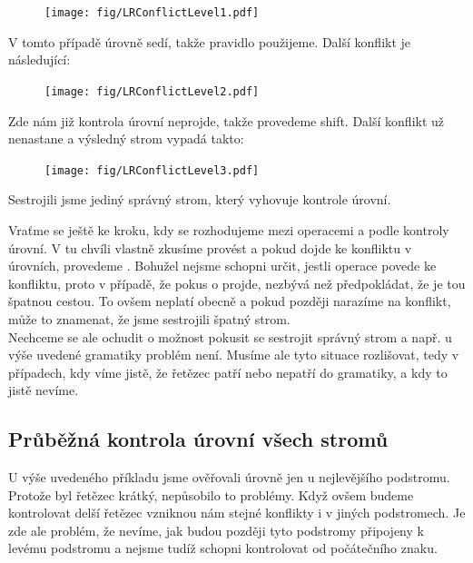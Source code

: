 \begin{exmp}
  \begin{figure}[H]
    \centering
    \texttt{[image: fig/LRConflictLevel1.pdf]}
  \end{figure}

  V tomto případě úrovně sedí, takže pravidlo použijeme.
  Další konflikt je následující:

  \begin{figure}[H]
    \centering
    \texttt{[image: fig/LRConflictLevel2.pdf]}
  \end{figure}

  Zde nám již kontrola úrovní neprojde, takže provedeme shift.
  Další konflikt už nenastane a výsledný strom vypadá takto:

  \begin{figure}[H]
    \centering
    \texttt{[image: fig/LRConflictLevel3.pdf]}
  \end{figure}

  Sestrojili jsme jediný správný strom, který vyhovuje kontrole úrovní.
\end{exmp}

Vraťme se ještě ke kroku, kdy se rozhodujeme mezi operacemi  a
 podle kontroly úrovní. V tu chvíli vlastně zkusíme provést
 a pokud dojde ke konfliktu v úrovních, provedeme .
Bohužel nejsme schopni určit, jestli operace  povede ke konfliktu,
proto v případě, že pokus o  projde, nezbývá než předpokládat, že
 je tou špatnou cestou.
To ovšem neplatí obecně a pokud později narazíme na konflikt, může to
znamenat, že jsme sestrojili špatný strom.\\

Nechceme se ale ochudit o možnost pokusit se sestrojit správný strom
a např. u výše uvedené gramatiky problém není.
Musíme ale tyto situace rozlišovat, tedy v případech, kdy víme jistě,
že řetězec patří nebo nepatří do gramatiky, a kdy to jistě nevíme.\\

\subsection*{Průběžná kontrola úrovní všech stromů}

U výše uvedeného příkladu jsme ověřovali úrovně jen u nejlevějšího
podstromu. Protože byl řetězec krátký, nepůsobilo to problémy.
Když ovšem budeme kontrolovat delší řetězec vzniknou nám stejné konflikty
i v jiných podstromech. Je zde ale problém, že nevíme, jak budou později
tyto podstromy připojeny k levému podstromu a nejsme tudíž schopni
kontrolovat od počátečního znaku.\\

